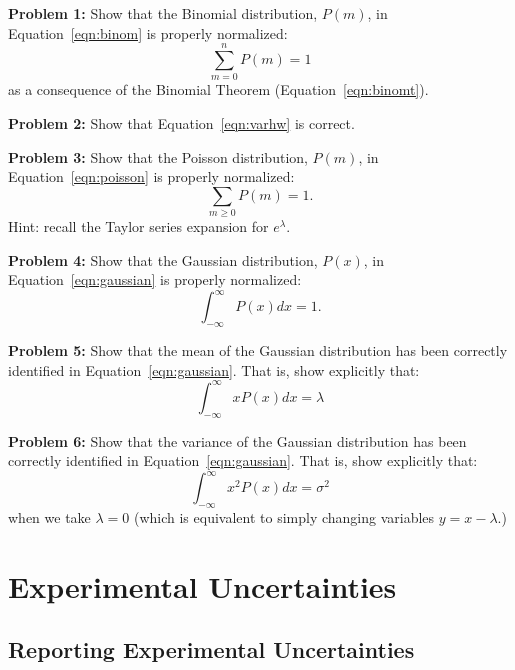 \documentclass[12pt,oneside]{book}
\begin{document}
\noindent
{\bf Problem 1:} Show that the Binomial distribution, $P(m)$, in Equation~\ref{eqn:binom} is properly normalized:
\begin{displaymath}
\sum_{m=0}^n P(m) = 1
\end{displaymath}
as a consequence of the Binomial Theorem (Equation~\ref{eqn:binomt}).

\vskip 1cm
\noindent
{\bf Problem 2:} Show that Equation~\ref{eqn:varhw} is correct.

\vskip 1cm
\noindent
{\bf Problem 3:} Show that the Poisson distribution, $P(m)$, in Equation~\ref{eqn:poisson} is properly normalized:
\begin{displaymath}
\sum_{m \geq 0} P(m) = 1.
\end{displaymath}
Hint: recall the Taylor series expansion for $e^\lambda$.

\vskip 1cm
\noindent
{\bf Problem 4:} Show that the Gaussian distribution, $P(x)$, in Equation~\ref{eqn:gaussian} is properly normalized:
\begin{displaymath}
\int_{-\infty}^{\infty} P(x) dx = 1.
\end{displaymath}

\vskip 1cm
\noindent
{\bf Problem 5:} Show that the mean of the Gaussian distribution has been correctly identified in Equation~\ref{eqn:gaussian}.  That is, show explicitly that:
\begin{displaymath}
\int_{-\infty}^{\infty} x P(x) dx = \lambda 
\end{displaymath}

\vskip 1cm
\noindent
{\bf Problem 6:} Show that the variance of the Gaussian distribution has been correctly identified in Equation~\ref{eqn:gaussian}.  That is, show explicitly that:
\begin{displaymath}
\int_{-\infty}^{\infty} x^2 P(x) dx = \sigma^2 
\end{displaymath}
when we take $\lambda=0$ (which is equivalent to simply changing variables $y=x-\lambda$.)
   
\newpage

\chapter{Experimental Uncertainties}

\section{Reporting Experimental Uncertainties}
\end{document}
